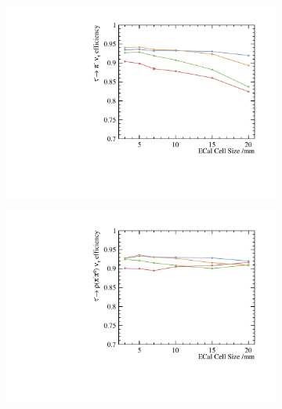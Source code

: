 \documentclass[a4paper,11pt]{article}
\begin{document}
\begin{figure}[htbp]
\centering %

\begin{subfigure}[b]{0.45\textwidth}
  \includegraphics[width=\textwidth]{plots/decayMode2}
  \caption{}
  \label{fig:decayMode2}
\end{subfigure}
\hfill
\begin{subfigure}[b]{0.45\textwidth}
  \includegraphics[width=\textwidth]{plots/decayMode3}
  \caption{}
  \label{fig:decayMode3}
\end{subfigure}



\end{figure}
\end{document}
